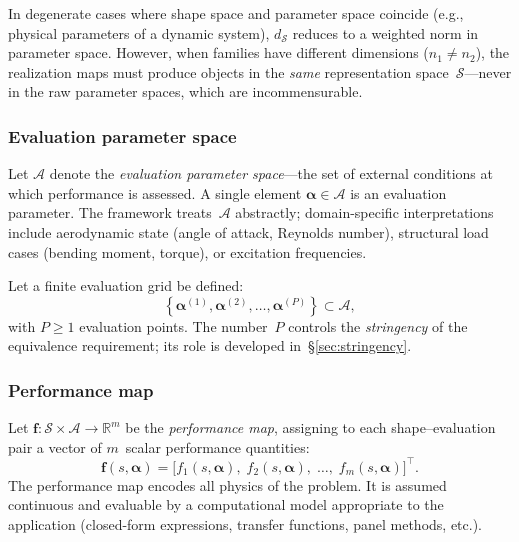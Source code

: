 \begin{remark}
In degenerate cases where shape space and parameter space coincide (e.g., physical parameters of a dynamic system), $d_{\mathcal{S}}$ reduces to a weighted norm in parameter space. However, when families have different dimensions ($n_1 \neq n_2$), the realization maps must produce objects in the \emph{same} representation space~$\mathcal{S}$---never in the raw parameter spaces, which are incommensurable.
\end{remark}


\subsubsection{Evaluation parameter space}
\label{sec:eval_params}

Let $\mathcal{A}$ denote the \emph{evaluation parameter space}---the set of external conditions at which performance is assessed. A single element $\boldsymbol{\alpha} \in \mathcal{A}$ is an evaluation parameter. The framework treats~$\mathcal{A}$ abstractly; domain-specific interpretations include aerodynamic state (angle of attack, Reynolds number), structural load cases (bending moment, torque), or excitation frequencies.

Let a finite evaluation grid be defined:
\begin{equation}
    \left\{ \boldsymbol{\alpha}^{(1)}, \boldsymbol{\alpha}^{(2)}, \ldots, \boldsymbol{\alpha}^{(P)} \right\} \subset \mathcal{A},
    \label{eq:eval_grid}
\end{equation}
with $P \geq 1$ evaluation points. The number~$P$ controls the \emph{stringency} of the equivalence requirement; its role is developed in~\S\ref{sec:stringency}.


\subsubsection{Performance map}
\label{sec:perf_map}

Let $\mathbf{f} : \mathcal{S} \times \mathcal{A} \to \mathbb{R}^m$ be the \emph{performance map}, assigning to each shape--evaluation pair a vector of $m$~scalar performance quantities:
\begin{equation}
    \mathbf{f}(s, \boldsymbol{\alpha})
    = \bigl[ f_1(s, \boldsymbol{\alpha}),\; f_2(s, \boldsymbol{\alpha}),\; \ldots,\; f_m(s, \boldsymbol{\alpha}) \bigr]^\top.
    \label{eq:perf_map}
\end{equation}
The performance map encodes all physics of the problem. It is assumed continuous and evaluable by a computational model appropriate to the application (closed-form expressions, transfer functions, panel methods, etc.).

